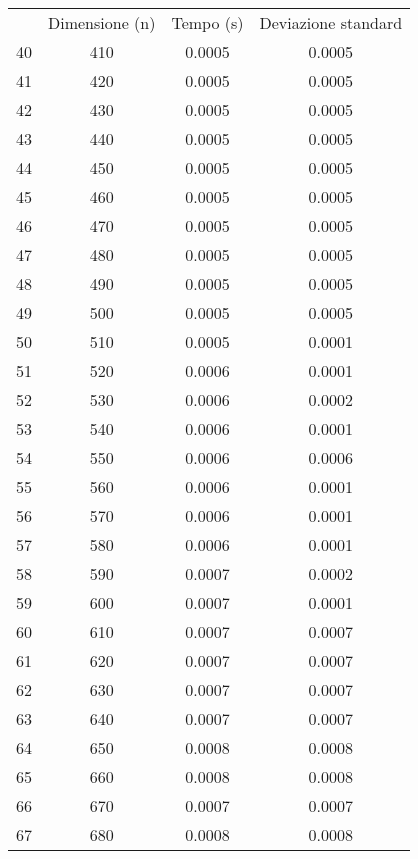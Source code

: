 \begin{table}
\centering
\begin{adjustbox}{width=1\textwidth/2}
\begin{tabular}{|c|c|c|c|}
\hline
 & Dimensione (n) & Tempo (s) & Deviazione standard \\
40 & 410 & 0.0005 & 0.0005 \\
\cline{1-4}
41 & 420 & 0.0005 & 0.0005 \\
\cline{1-4}
42 & 430 & 0.0005 & 0.0005 \\
\cline{1-4}
43 & 440 & 0.0005 & 0.0005 \\
\cline{1-4}
44 & 450 & 0.0005 & 0.0005 \\
\cline{1-4}
45 & 460 & 0.0005 & 0.0005 \\
\cline{1-4}
46 & 470 & 0.0005 & 0.0005 \\
\cline{1-4}
47 & 480 & 0.0005 & 0.0005 \\
\cline{1-4}
48 & 490 & 0.0005 & 0.0005 \\
\cline{1-4}
49 & 500 & 0.0005 & 0.0005 \\
\cline{1-4}
50 & 510 & 0.0005 & 0.0001 \\
\cline{1-4}
51 & 520 & 0.0006 & 0.0001 \\
\cline{1-4}
52 & 530 & 0.0006 & 0.0002 \\
\cline{1-4}
53 & 540 & 0.0006 & 0.0001 \\
\cline{1-4}
54 & 550 & 0.0006 & 0.0006 \\
\cline{1-4}
55 & 560 & 0.0006 & 0.0001 \\
\cline{1-4}
56 & 570 & 0.0006 & 0.0001 \\
\cline{1-4}
57 & 580 & 0.0006 & 0.0001 \\
\cline{1-4}
58 & 590 & 0.0007 & 0.0002 \\
\cline{1-4}
59 & 600 & 0.0007 & 0.0001 \\
\cline{1-4}
60 & 610 & 0.0007 & 0.0007 \\
\cline{1-4}
61 & 620 & 0.0007 & 0.0007 \\
\cline{1-4}
62 & 630 & 0.0007 & 0.0007 \\
\cline{1-4}
63 & 640 & 0.0007 & 0.0007 \\
\cline{1-4}
64 & 650 & 0.0008 & 0.0008 \\
\cline{1-4}
65 & 660 & 0.0008 & 0.0008 \\
\cline{1-4}
66 & 670 & 0.0007 & 0.0007 \\
\cline{1-4}
67 & 680 & 0.0008 & 0.0008 \\
\cline{1-4}

\end{tabular}
\end{adjustbox}
\end{table}

